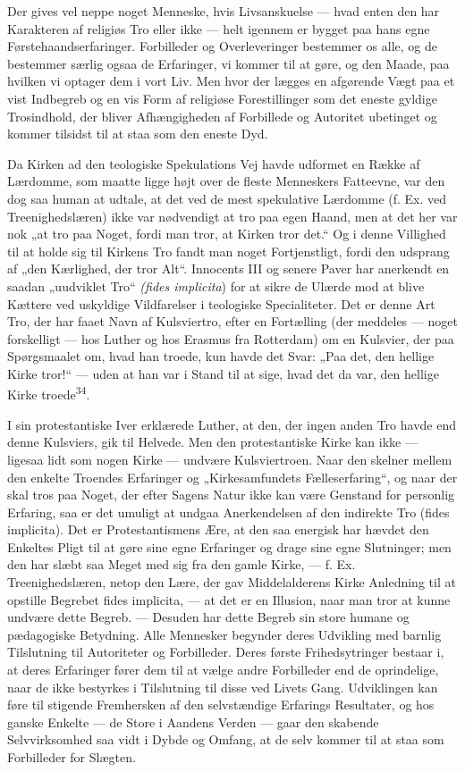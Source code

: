 \documentclass[12pt,a4paper,openany]{book}
\newcommand{\opage}[1]{\marginnote{\footnotesize\textit{[#1]}}}
\begin{document}
Der gives vel neppe noget Menneske, hvis Livsanskuelse --- hvad
\opage{79}enten den har Karakteren af religiøs Tro eller ikke --- helt
igennem er bygget paa hans egne Førstehaandserfaringer. Forbilleder og
Overleveringer bestemmer os alle, og de bestemmer særlig ogsaa de
Erfaringer, vi kommer til at gøre, og den Maade, paa hvilken vi optager
dem i vort Liv. Men hvor der lægges en afgørende Vægt paa et vist
Indbegreb og en vis Form af religiøse Forestillinger som det eneste
gyldige Trosindhold, der bliver Afhængigheden af Forbillede og Autoritet
ubetinget og kommer tilsidst til at staa som den eneste Dyd.

Da Kirken ad den teologiske Spekulations Vej havde udformet en Række af
Lærdomme, som maatte ligge højt over de fleste Menneskers Fatteevne, var
den dog saa human at udtale, at det ved de mest spekulative Lærdomme (f.
Ex. ved Treenighedslæren) ikke var nødvendigt at tro paa egen Haand, men
at det her var nok „at tro paa Noget, fordi man tror, at Kirken tror
det.“ Og i denne Villighed til at holde sig til Kirkens Tro fandt man
noget Fortjenstligt, fordi den udsprang af „den Kærlighed, der tror
Alt“. Innocents III og senere Paver har anerkendt en saadan „uudviklet
Tro“ \textit{(fides implicita}) for at sikre de Ulærde mod at blive
Kættere ved uskyldige Vildfarelser i teologiske Specialiteter. Det er
denne Art Tro, der har faaet Navn af Kulsviertro, efter en Fortælling
(der meddeles --- noget forskelligt --- hos Luther og hos Erasmus fra
Rotterdam) om en Kulsvier, der paa Spørgsmaalet om, hvad han troede, kun
havde det Svar: „Paa det, den hellige Kirke tror!“ --- uden at han var i
Stand til at sige, hvad det da var, den hellige Kirke
troede\textsuperscript{34}.

I sin protestantiske Iver erklærede Luther, at den, der ingen anden Tro
havde end denne Kulsviers, gik til Helvede. Men den protestantiske Kirke
kan ikke --- ligesaa lidt som nogen Kirke --- undvære Kulsviertroen.
Naar den skelner mellem den enkelte Troendes Erfaringer og
„Kirkesamfundets Fælleserfaring“, og naar der skal tros paa Noget, der
efter Sagens Natur ikke kan være Genstand for personlig Erfaring, saa er
det umuligt at undgaa Anerkendelsen af den indirekte Tro (fides
implicita). Det er Protestantismens Ære, at den saa energisk har hævdet
den Enkeltes Pligt til at gøre sine egne Erfaringer og drage sine egne
Slutninger; men den har slæbt saa Meget med sig fra den gamle Kirke, ---
f. Ex. Treenighedslæren, netop den Lære, der gav Middelalderens Kirke
Anledning til at opstille Begrebet fides implicita, --- at det er en
Illusion, naar man tror at kunne undvære dette Begreb. --- Desuden har
dette Begreb sin store humane
\opage{80}og pædagogiske Betydning. Alle Mennesker begynder deres
Udvikling med barnlig Tilslutning til Autoriteter og Forbilleder. Deres
første Frihedsytringer bestaar i, at deres Erfaringer fører dem til at
vælge andre Forbilleder end de oprindelige, naar de ikke bestyrkes i
Tilslutning til disse ved Livets Gang. Udviklingen kan føre til stigende
Fremhersken af den selvstændige Erfarings Resultater, og hos ganske
Enkelte --- de Store i Aandens Verden --- gaar den skabende
Selvvirksomhed saa vidt i Dybde og Omfang, at de selv kommer til at staa
som Forbilleder for Slægten.
\end{document}
